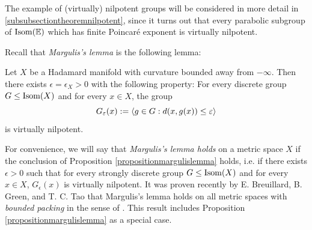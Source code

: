 The example of (virtually) nilpotent groups will be considered in more detail in \6\ref{subsubsectiontheoremnilpotent}, since it turns out that every parabolic subgroup of $\Isom(\E)$ which has finite Poincar\'e exponent is virtually nilpotent.

Recall that \emph{Margulis's lemma} is the following lemma:

\begin{proposition}
\label{propositionmargulislemma}
Let $X$ be a Hadamard manifold with curvature bounded away from $-\infty$. Then there exists $\epsilon = \epsilon_X > 0$ with the following property: For every discrete group $G\leq\operatorname{Isom}(X)$ and for every $x\in X$, the group
\[
G_\varepsilon(x) := \langle g\in G : d(x,g(x)) \leq \varepsilon\rangle
\]
is virtually nilpotent.
\end{proposition}
For convenience, we will say that \emph{Margulis's lemma holds} on a metric space $X$ if the conclusion of Proposition \ref{propositionmargulislemma} holds, i.e. if there exists $\epsilon > 0$ such that for every strongly discrete group $G\leq\operatorname{Isom}(X)$ and for every $x\in X$, $G_\epsilon(x)$ is virtually nilpotent. It was proven recently by E. Breuillard, B. Green, and T. C. Tao \cite[Corollary 1.15]{BGT} that Margulis's lemma holds on all metric spaces with \emph{bounded packing} in the sense of \cite{BGT}. This result includes Proposition \ref{propositionmargulislemma} as a special case.

